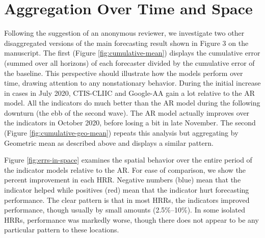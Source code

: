 

\section{Aggregation Over Time and Space}

Following the suggestion of an anonymous reviewer, we investigate two
other disaggregated versions of the main forecasting result shown in Figure 3 on the
manuscript. The first (Figure \ref{fig:cumulative-mean}) displays the cumulative
error (summed over all horizons) of each forecaster divided by the cumulative
error of the baseline.  This perspective should illustrate how the models
perform over time, drawing attention to any nonstationary behavior.  During the
initial increase in cases in July 2020, CTIS-CLIIC and Google-AA gain a lot
relative to the AR model. All the indicators do much better than the AR model
during the following downturn (the ebb of the second wave). The AR model
actually improves over the indicators in October 2020, before losing a bit in
late November. The second (Figure \ref{fig:cumulative-geo-mean}) repeats this 
analysis but aggregating by Geometric mean as described above and displays a
similar pattern.

Figure \ref{fig:errs-in-space} examines the spatial behavior over the entire
period of the indicator models relative to the AR. For ease of
comparison, we show the percent improvement in each HRR. Negative numbers (blue)
mean that the indicator helped while positives (red) mean that the indicator
hurt forecasting performance. The clear pattern is that in most HRRs, the
indicators improved performance, though usually by small amounts (2.5\%--10\%).
In some isolated HRRs, performance was markedly worse, though there does not
appear to be any particular pattern to these locations.
